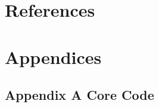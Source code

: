 \documentclass[fontset=mac, 12pt, a4paper]{ctexart}
\begin{document}








\section*{References}


\section*{Appendices}
\subsection*{Appendix A \quad Core Code}

\end{document}
